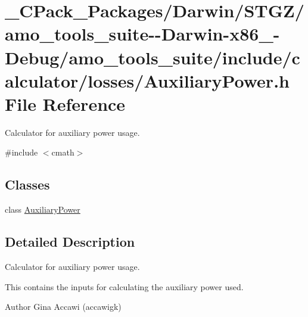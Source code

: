 \hypertarget{___c_pack___packages_2_darwin_2_s_t_g_z_2amo__tools__suite--_darwin-x86__64-_debug_2amo__tools__c4f23f25f536f732e5fa703f6bc0dbc9}{}\section{\+\_\+\+C\+Pack\+\_\+\+Packages/\+Darwin/\+S\+T\+G\+Z/amo\+\_\+tools\+\_\+suite-\/-\/\+Darwin-\/x86\+\_-\/\+Debug/amo\+\_\+tools\+\_\+suite/include/calculator/losses/\+Auxiliary\+Power.h File Reference}
\label{___c_pack___packages_2_darwin_2_s_t_g_z_2amo__tools__suite--_darwin-x86__64-_debug_2amo__tools__c4f23f25f536f732e5fa703f6bc0dbc9}


Calculator for auxiliary power usage.  


{\ttfamily \#include $<$cmath$>$}\newline
\subsection*{Classes}
\begin{DoxyCompactItemize}
\item 
class \hyperlink{class_auxiliary_power}{Auxiliary\+Power}
\end{DoxyCompactItemize}


\subsection{Detailed Description}
Calculator for auxiliary power usage. 

This contains the inputs for calculating the auxiliary power used.

\begin{DoxyAuthor}{Author}
Gina Accawi (accawigk) 
\end{DoxyAuthor}

